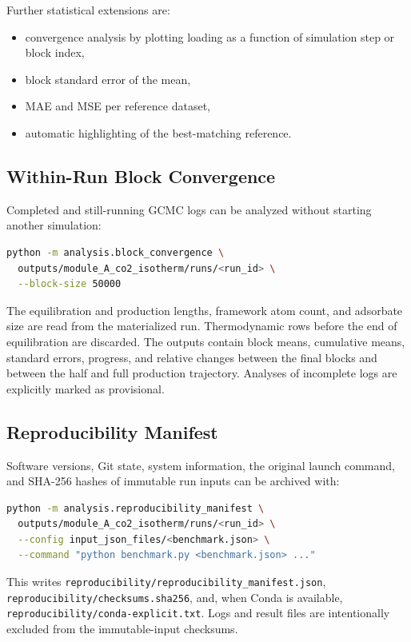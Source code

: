 Further statistical extensions are:

\begin{itemize}
    \item convergence analysis by plotting loading as a function of simulation step or block index,
    \item block standard error of the mean,
    \item MAE and MSE per reference dataset,
    \item automatic highlighting of the best-matching reference.
\end{itemize}

\subsection{Within-Run Block Convergence}

Completed and still-running GCMC logs can be analyzed without starting another
simulation:

\begin{lstlisting}[language=bash]
python -m analysis.block_convergence \
  outputs/module_A_co2_isotherm/runs/<run_id> \
  --block-size 50000
\end{lstlisting}

The equilibration and production lengths, framework atom count, and adsorbate
size are read from the materialized run. Thermodynamic rows before the end of
equilibration are discarded. The outputs contain block means, cumulative means,
standard errors, progress, and relative changes between the final blocks and
between the half and full production trajectory. Analyses of incomplete logs
are explicitly marked as provisional.

\subsection{Reproducibility Manifest}

Software versions, Git state, system information, the original launch command,
and SHA-256 hashes of immutable run inputs can be archived with:

\begin{lstlisting}[language=bash]
python -m analysis.reproducibility_manifest \
  outputs/module_A_co2_isotherm/runs/<run_id> \
  --config input_json_files/<benchmark.json> \
  --command "python benchmark.py <benchmark.json> ..."
\end{lstlisting}

This writes \texttt{reproducibility/reproducibility\_manifest.json},
\texttt{reproducibility/checksums.sha256}, and, when Conda is available,
\texttt{reproducibility/conda-explicit.txt}. Logs and result files are
intentionally excluded from the immutable-input checksums.

